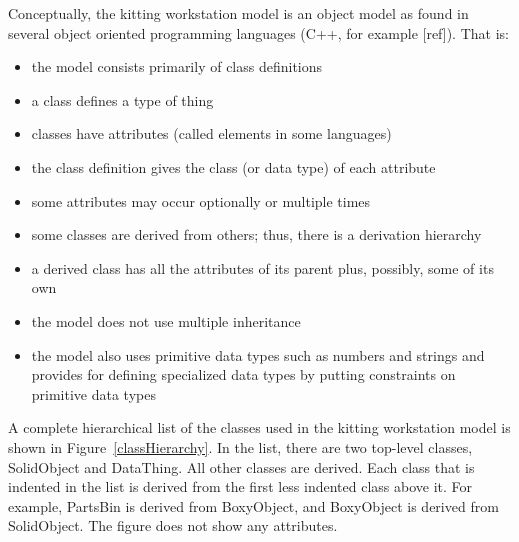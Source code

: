 Conceptually, the kitting workstation model is an object model as found in
several object oriented programming languages (C++, for example [ref]).
That is:
\begin{itemize}
\item the model consists primarily of class definitions
\item a class defines a type of thing
\item classes have attributes (called elements in some languages)
\item the class definition gives the class (or data type) of each attribute
\item some attributes may occur optionally or multiple times
\item some classes are derived from others; thus, there is a derivation
 hierarchy 
\item a derived class has all the attributes of its parent plus, possibly,
  some of its own
\item the model does not use multiple inheritance
\item the model also uses primitive data types such as numbers and strings
  and provides for defining specialized data types by putting constraints
  on primitive data types
\end{itemize}

A complete hierarchical list of the classes used in the kitting workstation
model is shown in Figure~\ref{classHierarchy}. In the list, there are two
top-level classes, SolidObject and DataThing. All other classes are
derived. Each class that is indented in the list is derived from the first
less indented class above it. For example, PartsBin is derived from
BoxyObject, and BoxyObject is derived from SolidObject. The figure does not
show any attributes.

